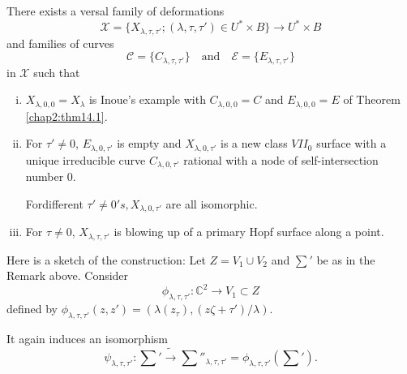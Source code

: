    \begin{theorem}\label{chap2:thm14.2}
There exists a versal family of deformations 
$$
\mathscr{X}=\{ X_{ \lambda, \tau, \tau' }; ( \lambda , \tau , \tau')
  \in U^* \times B\} \longrightarrow U^* \times B  
$$
and families of curves
$$
\mathscr{C} = \{ C_{\lambda, \tau , \tau'}\} \quad \text{and} \quad 
\mathscr{E} = \{E_{\lambda, \tau, \tau'}\}  
$$
 in $\mathscr{X}$ such that 
 \begin{enumerate}[(i)]
\item  $X_{\lambda, 0, 0}= X_\lambda$ is Inoue's  example with
  $C_{\lambda, 0,0} = C$ and $ E_{ \lambda , 0,0}=E$ of Theorem
  \ref{chap2:thm14.1}. 

\item For $\tau '  \neq 0$, $E_{\lambda, 0, \tau '}$ is empty and
  $X_{\lambda, 0, \tau '}$ is a new class $VII_0$ surface with a
  unique irreducible curve $C_{ \lambda, 0, \tau'}$ rational with a
  node of self-intersection number 0.  

For\pageoriginale different $ \tau ' \neq 0  's ,  X_ { \lambda, 0
  ,\tau'}$  are all isomorphic.   

\item For $\tau  \neq 0$, \quad  $X_{\lambda, \tau, \tau'}$ is blowing
  up of a primary Hopf surface  along a point. 
 \end{enumerate} 
   \end{theorem}   
   
   Here is a sketch of the construction: Let $Z=V_1 \cup V_2$ and
   $\sum'$ be as in the Remark above. Consider  
     $$
   \phi_{\lambda , \tau , \tau'}: \mathbb{C}^2 \longrightarrow V_1
   \subset Z 
   $$
   \noindent
   defined by $\phi_{ \lambda, \tau,\tau'}(z, z') = ( \lambda(z_
   \tau), ( z \zeta + \tau ' ) / \lambda)$. 
   
   \noindent
   It again induces an isomorphism
   $$
   \psi_{\lambda, \tau, \tau '}: \sum ' \tilde{\longrightarrow} 
   \sum''_{\lambda, \tau , \tau '}= \phi_{\lambda, \tau, \tau
     '}(\sum '). 
   $$ 
   
